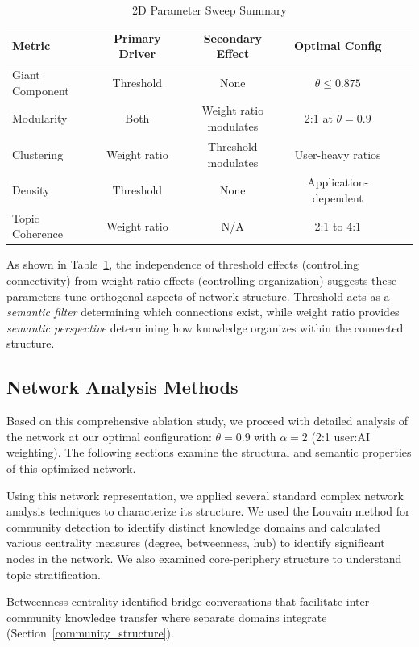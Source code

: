 \documentclass{svproc}
\begin{document}
\begin{table}[h]
\centering
\caption{2D Parameter Sweep Summary}
\label{tab:2d_summary}
\begin{tabular}{lccccc}
\toprule
\textbf{Metric} & \textbf{Primary Driver} & \textbf{Secondary Effect} & \textbf{Optimal Config} \\
\midrule
Giant Component & Threshold & None & $\theta \leq 0.875$ \\
Modularity & Both & Weight ratio modulates & 2:1 at $\theta=0.9$ \\
Clustering & Weight ratio & Threshold modulates & User-heavy ratios \\
Density & Threshold & None & Application-dependent \\
Topic Coherence & Weight ratio & N/A & 2:1 to 4:1 \\
\bottomrule
\end{tabular}
\end{table}

As shown in Table~\ref{tab:2d_summary}, the independence of threshold effects (controlling connectivity) from weight ratio effects (controlling organization) suggests these parameters tune orthogonal aspects of network structure. Threshold acts as a \emph{semantic filter} determining which connections exist, while weight ratio provides \emph{semantic perspective} determining how knowledge organizes within the connected structure.

\subsection{Network Analysis Methods}

Based on this comprehensive ablation study, we proceed with detailed analysis of the network at our optimal configuration: $\theta = 0.9$ with $\alpha = 2$ (2:1 user:AI weighting). The following sections examine the structural and semantic properties of this optimized network.

Using this network representation, we applied several standard complex network analysis techniques to characterize its structure. We used the Louvain method \cite{blondel2008} for community detection to identify distinct knowledge domains and calculated various centrality measures (degree, betweenness, hub) to identify significant nodes in the network. We also examined core-periphery structure to understand topic stratification.

Betweenness centrality identified bridge conversations that facilitate inter-community knowledge transfer where separate domains integrate (Section~\ref{community_structure}).
\end{document}
